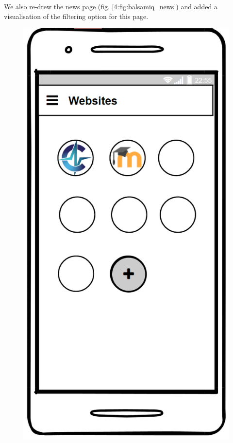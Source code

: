 We also re-drew the news page (fig. \ref{4:fig:balsamiq_news}) and added a visualisation of the filtering option for this page.

\begin{figure}[!ht]
    \centering
    \begin{minipage}[b]{0.26\textwidth}
        \captionsetup{justification=centering}
        \includegraphics[width=\textwidth]{figures/app/balsamiq/websites.png}

\end{minipage}
\end{figure}
